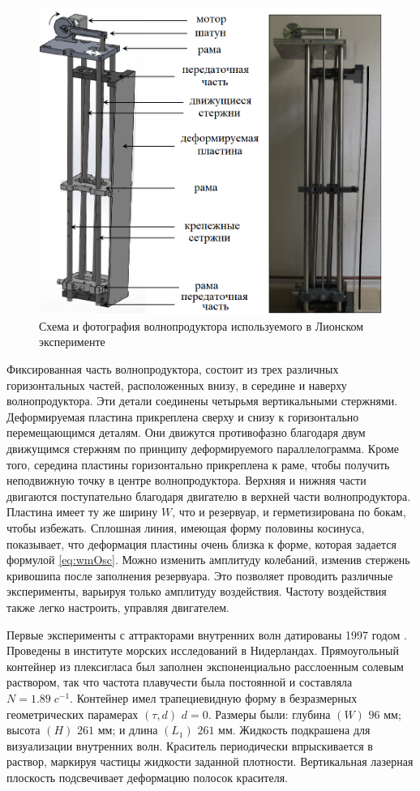 \begin{figure}
    \centering
    \includegraphics[scale=0.45]{pics/WMplate.png}
    \caption{Схема и фотография волнопродуктора используемого в Лионском эксперименте \cite{Brouzet_2016}}
    \label{fig:WMplate}
\end{figure}

Фиксированная часть волнопродуктора, состоит из трех различных горизонтальных частей, расположенных внизу, в середине и наверху волнопродуктора. Эти детали соединены четырьмя вертикальными стержнями. Деформируемая пластина прикреплена сверху и снизу к горизонтально перемещающимся деталям. Они движутся противофазно благодаря двум движущимся стержням по принципу деформируемого параллелограмма. Кроме того, середина пластины горизонтально прикреплена к раме, чтобы получить неподвижную точку в центре волнопродуктора. Верхняя и нижняя части двигаются поступательно благодаря двигателю в верхней части волнопродуктора. Пластина имеет ту же ширину $W$, что и резервуар, и герметизирована по бокам, чтобы избежать. Сплошная линия, имеющая форму половины косинуса, показывает, что деформация пластины очень близка к форме, которая задается формулой \ref{eq:wmOsc}. Можно изменить амплитуду колебаний, изменив стержень кривошипа после заполнения резервуара. Это позволяет проводить различные эксперименты, варьируя только амплитуду воздействия. Частоту воздействия также легко настроить, управляя двигателем.

Первые эксперименты с аттракторами внутренних волн датированы 1997 годом \cite{Maas1997}. Проведены в институте морских исследований в Нидерландах. Прямоугольный контейнер из плексигласа был заполнен экспоненциально расслоенным солевым раствором, так что частота плавучести была постоянной и составляла $N = 1.89 \; c^{-1}$. Контейнер имел трапециевидную форму в безразмерных геометрических парамерах $(\tau, d)$ $d=0$. Размеры были: глубина $(W)$ $96$ мм; высота $(H)$ $261$ мм; и длина $(L_1)$ $261$ мм. Жидкость подкрашена для визуализации внутренних волн. Краситель периодически впрыскивается в раствор, маркируя частицы жидкости заданной плотности. Вертикальная лазерная плоскость подсвечивает деформацию полосок красителя.

